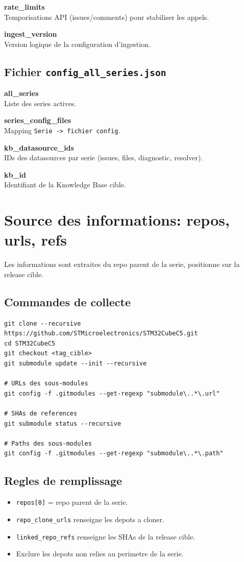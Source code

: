 \documentclass[11pt,a4paper]{article}
\begin{document}
\textbf{rate\_limits}\\
Temporisations API (issues/comments) pour stabiliser les appels.

\textbf{ingest\_version}\\
Version logique de la configuration d'ingestion.

\subsection{Fichier \texttt{config\_all\_series.json}}
\textbf{all\_series}\\
Liste des series actives.

\textbf{series\_config\_files}\\
Mapping \texttt{Serie -> fichier config}.

\textbf{kb\_datasource\_ids}\\
IDs des datasources par serie (issues, files, diagnostic, resolver).

\textbf{kb\_id}\\
Identifiant de la Knowledge Base cible.

\section{Source des informations: repos, urls, refs}
Les informations sont extraites du repo parent de la serie, positionne sur la
release cible.

\subsection{Commandes de collecte}
\begin{lstlisting}[style=cmd]
git clone --recursive https://github.com/STMicroelectronics/STM32CubeC5.git
cd STM32CubeC5
git checkout <tag_cible>
git submodule update --init --recursive

# URLs des sous-modules
git config -f .gitmodules --get-regexp "submodule\..*\.url"

# SHAs de references
git submodule status --recursive

# Paths des sous-modules
git config -f .gitmodules --get-regexp "submodule\..*\.path"
\end{lstlisting}

\subsection{Regles de remplissage}
\begin{itemize}[leftmargin=*]
  \item \texttt{repos[0]} = repo parent de la serie.
  \item \texttt{repo\_clone\_urls} renseigne les depots a cloner.
  \item \texttt{linked\_repo\_refs} renseigne les SHAs de la release cible.
  \item Exclure les depots non relies au perimetre de la serie.
\end{itemize}
\end{document}
